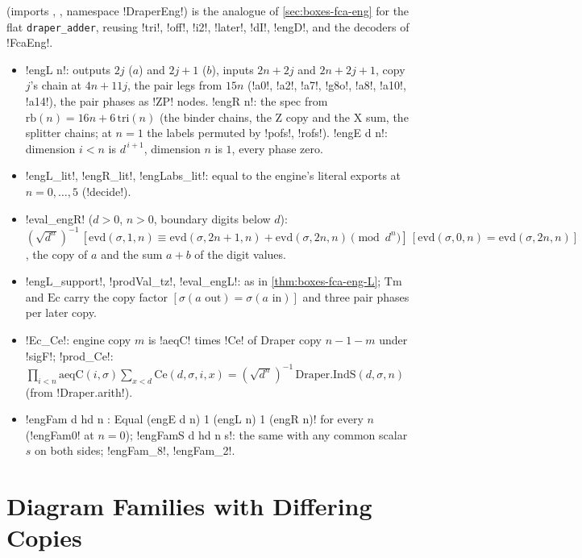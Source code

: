 { (imports , , namespace \lbx!DraperEng!) is the analogue of \cref{sec:boxes-fca-eng} for the flat \texttt{draper\_adder}, reusing \lbx!tri!, \lbx!off!, \lbx!i2!, \lbx!later!, \lbx!dI!, \lbx!engD!, and the decoders of \lbx!FcaEng!.
\begin{itemize}
\item \lbx!engL n!: outputs $2j$ ($a$) and $2j+1$ ($b$), inputs $2n+2j$ and $2n+2j+1$, copy $j$'s chain at $4n+11j$, the pair legs from $15n$ (\lbx!a0!, \lbx!a2!, \lbx!a7!, \lbx!g8o!, \lbx!a8!, \lbx!a10!, \lbx!a14!), the pair phases as \lbx!ZP! nodes. \lbx!engR n!: the spec from $\mathrm{rb}(n)=16n+6\,\mathrm{tri}(n)$ (the binder chains, the Z copy and the X sum, the splitter chains; at $n=1$ the labels permuted by \lbx!pofs!, \lbx!rofs!). \lbx!engE d n!: dimension $i<n$ is $d^{\,i+1}$, dimension $n$ is $1$, every phase zero.
\item \lbx!engL_lit!, \lbx!engR_lit!, \lbx!engLabs_lit!: equal to the engine's literal exports at $n=0,\ldots,5$ (\lbx!decide!).
\item \lbx!eval_engR! ($d>0$, $n>0$, boundary digits below $d$): $(\sqrt{d^n})^{-1}\,[\mathrm{evd}(\sigma,1,n)\equiv\mathrm{evd}(\sigma,2n+1,n)+\mathrm{evd}(\sigma,2n,n)\pmod{d^n}]\,[\mathrm{evd}(\sigma,0,n)=\mathrm{evd}(\sigma,2n,n)]$, the copy of $a$ and the sum $a+b$ of the digit values.
\item \lbx!engL_support!, \lbx!prodVal_tz!, \lbx!eval_engL!: as in \cref{thm:boxes-fca-eng-L}; $\mathrm{Tm}$ and $\mathrm{Ec}$ carry the copy factor $[\sigma(a\text{ out})=\sigma(a\text{ in})]$ and three pair phases per later copy.
\item \lbx!Ec_Ce!: engine copy $m$ is \lbx!aeqC! times \lbx!Ce! of Draper copy $n-1-m$ under \lbx!sigF!; \lbx!prod_Ce!: $\prod_{i<n}\mathrm{aeqC}(i,\sigma)\sum_{x<d}\mathrm{Ce}(d,\sigma,i,x)=(\sqrt{d^n})^{-1}\,\mathrm{Draper.IndS}(d,\sigma,n)$ (from \lbx!Draper.arith!).
\item \lbx!engFam d hd n : Equal (engE d n) 1 (engL n) 1 (engR n)! for every $n$ (\lbx!engFam0! at $n=0$); \lbx!engFamS d hd n s!: the same with any common scalar $s$ on both sides; \lbx!engFam_8!, \lbx!engFam_2!.
\end{itemize}

\section{Diagram Families with Differing Copies}\label{sec:boxes-famdiagram}

}
